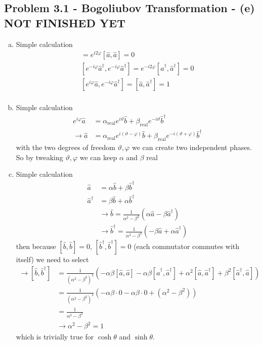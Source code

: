 \documentclass[../main.tex]{subfiles}
\begin{document}
\subsection{Problem 3.1 - Bogoliubov Transformation - (e) NOT FINISHED YET}
\begin{enumerate}[(a)]
\item Simple calculation
\begin{align}
[e^{i\varphi}\hat{a},e^{i\varphi}\hat{a}]=e^{i2\varphi}[\hat{a},\hat{a}]=0\\
[e^{-i\varphi}\hat{a}^\dagger,e^{-i\varphi}\hat{a}^\dagger]=e^{-i2\varphi}[\hat{a}^\dagger,\hat{a}^\dagger]=0\\
[e^{i\varphi}\hat{a},e^{-i\varphi}\hat{a}^\dagger]=[\hat{a},\hat{a}^\dagger]=1\\
\end{align}
\item Simple calculation
\begin{align}
e^{i\varphi}\hat{a}
&=\alpha_\text{real} e^{i\vartheta}\hat{b}+\beta_\text{real} e^{-i\vartheta}\hat{b}^\dagger\\
\rightarrow \hat{a}
&=\alpha_\text{real} e^{i(\vartheta-\varphi)}\hat{b}+\beta_\text{real} e^{-i(\vartheta+\varphi)}\hat{b}^\dagger
\end{align}
with the two degrees of freedom $\vartheta,\varphi$ we can create two independent phases. So by tweaking $\vartheta,\varphi$ we can keep $\alpha$ and $\beta$ real

\item Simple calculation
\begin{align}
\hat{a}&=\alpha\hat{b}+\beta\hat{b}^\dagger\\
\hat{a}^\dagger&=\beta\hat{b}+\alpha\hat{b}^\dagger\\
&\rightarrow \hat{b}=
\frac{1}{\alpha^2-\beta^2}(\alpha\hat{a}-\beta\hat{a}^\dagger)\\
&\rightarrow \hat{b}^\dagger=
\frac{1}{\alpha^2-\beta^2}(-\beta\hat{a}+\alpha\hat{a}^\dagger)
\end{align}
then because $[\hat{b},\hat{b}]=0$, $[\hat{b}^\dagger,\hat{b}^\dagger]=0$ (each commutator commutes with itself) we need to select 
\begin{align}
\rightarrow[\hat{b},\hat{b}^\dagger]
&=\frac{1}{(\alpha^2-\beta^2)^2}(-\alpha\beta[\hat{a},\hat{a}]-\alpha\beta[\hat{a}^\dagger,\hat{a}^\dagger]+\alpha^2[\hat{a},\hat{a}^\dagger]+\beta^2[\hat{a}^\dagger,\hat{a}])\\
&=\frac{1}{(\alpha^2-\beta^2)^2}(-\alpha\beta\cdot0-\alpha\beta\cdot0+(\alpha^2-\beta^2))\\
&=\frac{1}{\alpha^2-\beta^2}\\
&\rightarrow \alpha^2-\beta^2=1
\end{align}
which is trivially true for $\cosh\theta$ and $\sinh\theta$.


\end{enumerate}
\end{document}
